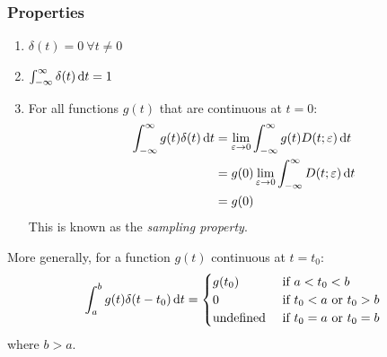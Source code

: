 \documentclass[../main.tex]{subfiles}
\begin{document}
\subsubsection{Properties}
\begin{enumerate}
  \item $\delta(t) = 0\ \forall t\neq 0$
  \item $\int_{-\infty}^{\infty} \delta(t) \d{t} = 1$
  \item For all functions $g(t)$ that are continuous at $t = 0$:
    \begin{align*}
      \int_{-\infty}^{\infty} g(t)\delta(t) \d{t} &= \lim_{\varepsilon \to 0} \int_{-\infty}^{\infty} g(t)D(t; \varepsilon) \d{t} \\
                                                  &=g(0) \lim_{\varepsilon \to 0} \int_{-\infty}^{\infty} D(t; \varepsilon) \d{t} \\
                                                  &=g(0)
    \end{align*}
    This is known as the \textit{sampling property}.
\end{enumerate}
More generally, for a function $g(t)$ continuous at $t = t_0$:
\[
  \int_{a}^{b} g(t)\delta(t - t_0) \d{t} = \begin{cases}
  g(t_0) & \text{ if }  a < t_0 < b \\
  0 & \text{ if $t_0 < a$ or $t_0 > b$} \\
  \text{undefined} & \text{ if $t_0 = a$ or $t_0 = b$}
  \end{cases}
\]
where $b > a$.
\end{document}
